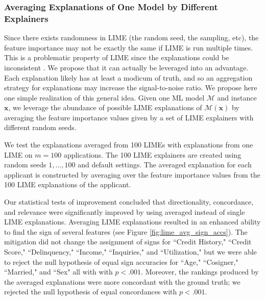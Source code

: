 \documentclass[mnsc,blindrev]{informs3}
\begin{document}
            \subsubsection{Averaging Explanations of One Model by Different Explainers}
            \label{sec:averaging_one_explainer}
            Since there exists randomness in LIME (the random seed, the sampling, etc), the feature importance may not be exactly the same if LIME is run multiple times. This is a problematic property of LIME since the explanations could be inconsistent \citep{alvarez18robustness}. 
        We propose that it can actually be leveraged into an advantage. Each explanation likely has at least a modicum of truth, and so an aggregation strategy for explanations may increase the signal-to-noise ratio. We propose here one simple realization of this general idea. Given one ML model $\mathcal{M}$ and instance $\mathbf{x}$, we leverage the abundance of possible LIME explanations of $\mathcal{M}(\mathbf{x})$ by averaging the feature importance values given by a set of LIME explainers with different random seeds.
        
            We test the explanations averaged from 100 LIMEs with explanations from one LIME on  $m=100$ applications. The 100 LIME explainers are created using random seeds $1,\ldots,100$ and default settings. The averaged explanation for each applicant is constructed by averaging over the feature importance values from the 100 LIME explanations of the applicant.  %

            Our statistical tests of improvement concluded that directionality, concordance, and relevance were significantly improved by using averaged instead of single LIME explanations. Averaging LIME explanations resulted in an enhanced ability to find the sign of several features (see Figure \ref{fig:lime_avg_sign_accs}). The mitigation did not change the assignment of signs for ``Credit History," ``Credit Score," ``Delinquency," ``Income," ``Inquiries," and ``Utilization," but we were able to reject the null hypothesis of equal sign accuracies for ``Age," ``Cosigner," ``Married," and ``Sex" all with with $p<.001$. %
            Moreover, the rankings produced by the averaged explanations were more concordant with the ground truth; we rejected the null hypothesis of equal concordances with $p<.001$.%
\end{document}
